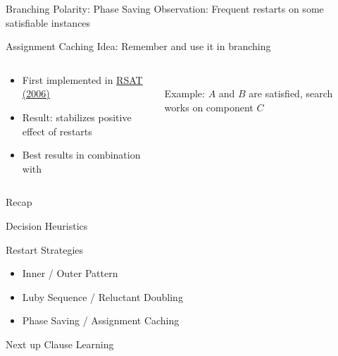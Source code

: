 \documentclass[t]{sdqbeamer}
\begin{document}
\begin{frame}{Branching Polarity: Phase Saving}
Observation: Frequent {restarts}  on some satisfiable instances\\[1em]
\begin{block}{Assignment Caching}
Idea: Remember  and use it  in branching
\begin{columns}[T]
\begin{column}{0.55\textwidth}
\begin{itemize}\setlength{\itemsep}{1em}
	\item First implemented in \href{http://reasoning.cs.ucla.edu/rsat/}{RSAT (2006)}
	\item Result:  stabilizes positive effect of restarts
	\item Best results in combination with 
\end{itemize}
\end{column}
\begin{column}{0.4\textwidth}
\centering
{}~\\
Example: $A$ and $B$ are satisfied, search works on component $C$
\end{column}
\end{columns}
\end{block}
\end{frame}

\begin{frame}{Recap}
	\begin{block}{Decision Heuristics}
	\end{block}
	\begin{block}{Restart Strategies}
		\begin{itemize}\setlength{\itemsep}{1ex}
			\item Inner / Outer Pattern
			\item Luby Sequence / Reluctant Doubling
			\item Phase Saving / Assignment Caching
		\end{itemize}
	\end{block}
	\begin{block}{Next up}
		Clause Learning
	\end{block}
\end{frame}
\end{document}
